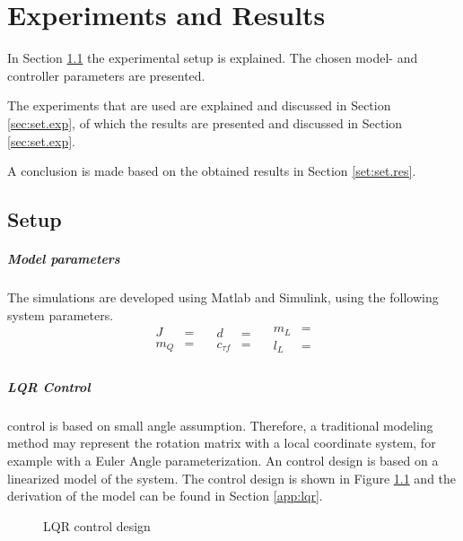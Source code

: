 \chapter{Experiments and Results}\label{ch:results}
In Section \ref{sec:set.setup} the experimental setup is explained. The chosen model- and controller parameters are presented.

The experiments that are used are explained and discussed in Section \ref{sec:set.exp}, of which the results are presented and discussed in Section \ref{sec:set.exp}.

A conclusion is made based on the obtained results in Section \ref{set:set.res}.

\section{Setup}\label{sec:set.setup}
\paragraph{Model parameters}
The simulations are developed using Matlab and Simulink, using the following system parameters.
\begin{equation}\label{key}
\begin{aligned}
J&=\\
m_Q&=\\
\nonumber
\end{aligned}
\quad
\begin{aligned}
d&=\\
c_{\tau f}&=\\
\nonumber
\end{aligned}
\quad
\begin{aligned}
m_L&=\\
l_L&=\\
\nonumber
\end{aligned}
\end{equation}

\paragraph{LQR Control}
 control is based on small angle assumption. Therefore, a traditional modeling method may represent the rotation matrix with a local coordinate system, for example with a Euler Angle parameterization. An  control design is based on a linearized model of the system. The control design is shown in Figure \ref{fig:set.lqr} and the derivation of the model can be found in Section \ref{app:lqr}.
\begin{figure}[h!]
	\centering
	\caption{LQR control design\label{fig:set.lqr}}
\end{figure}		

